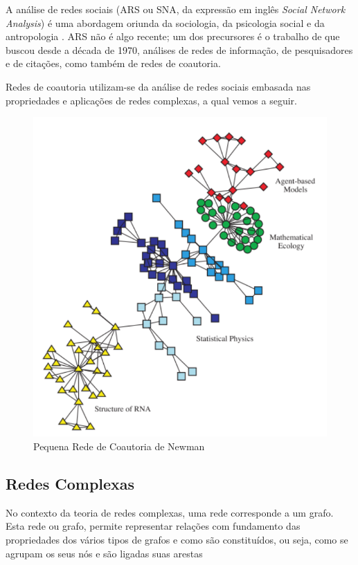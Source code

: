 \documentclass[12pt]{article}
\begin{document}
A análise de redes sociais (ARS ou SNA, da expressão em inglês \textit{Social Network Analysis}) é uma abordagem oriunda da sociologia, da psicologia social e da antropologia \citep{freeman1996some,wasserman1994social}. 
ARS não é algo recente; um dos precursores é o trabalho de \cite{otte2002social} que buscou desde a década de 1970, análises de redes de informação, de pesquisadores e de citações, como também de redes de coautoria.

Redes de coautoria utilizam-se da análise de redes sociais embasada nas propriedades e aplicações de redes complexas, a qual vemos a seguir.


\begin{figure}[H]
\centering
\includegraphics[scale=0.6]{images/rede-newman.pdf}
\caption{Pequena Rede de Coautoria de Newman}
\label{rede1}
\end{figure}


\subsection{Redes Complexas}

No contexto da teoria de redes complexas, uma rede corresponde a um grafo.
Esta rede ou grafo, permite representar relações com fundamento das propriedades dos vários tipos de grafos e como são constituídos, ou seja, como se agrupam os seus nós e são ligadas suas arestas %
\end{document}
